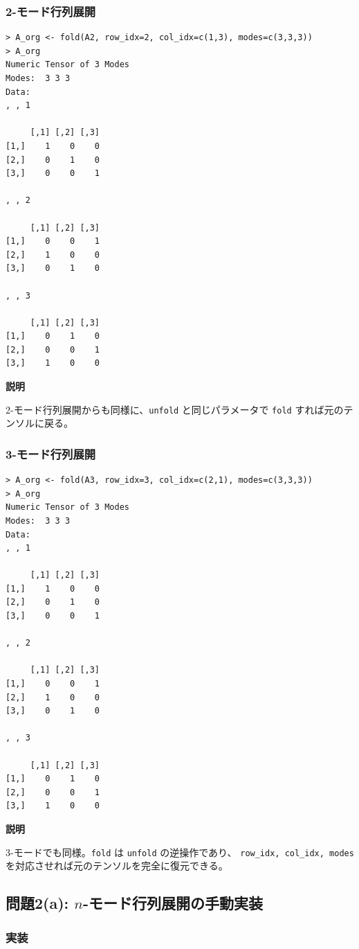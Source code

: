 \documentclass[12pt,a4paper]{ltjsarticle}
\begin{document}
\subsubsection{2-モード行列展開}
\begin{lstlisting}
> A_org <- fold(A2, row_idx=2, col_idx=c(1,3), modes=c(3,3,3))
> A_org
Numeric Tensor of 3 Modes
Modes:  3 3 3
Data:
, , 1

     [,1] [,2] [,3]
[1,]    1    0    0
[2,]    0    1    0
[3,]    0    0    1

, , 2

     [,1] [,2] [,3]
[1,]    0    0    1
[2,]    1    0    0
[3,]    0    1    0

, , 3

     [,1] [,2] [,3]
[1,]    0    1    0
[2,]    0    0    1
[3,]    1    0    0
\end{lstlisting}

\textbf{説明}

2-モード行列展開からも同様に、\texttt{unfold} と同じパラメータで
\texttt{fold} すれば元のテンソルに戻る。


\subsubsection{3-モード行列展開}
\begin{lstlisting}
> A_org <- fold(A3, row_idx=3, col_idx=c(2,1), modes=c(3,3,3))
> A_org
Numeric Tensor of 3 Modes
Modes:  3 3 3
Data:
, , 1

     [,1] [,2] [,3]
[1,]    1    0    0
[2,]    0    1    0
[3,]    0    0    1

, , 2

     [,1] [,2] [,3]
[1,]    0    0    1
[2,]    1    0    0
[3,]    0    1    0

, , 3

     [,1] [,2] [,3]
[1,]    0    1    0
[2,]    0    0    1
[3,]    1    0    0
\end{lstlisting}

\textbf{説明}

3-モードでも同様。\texttt{fold} は \texttt{unfold} の逆操作であり、
\texttt{row\_idx, col\_idx, modes} を対応させれば元のテンソルを完全に復元できる。

\newpage
\subsection{問題2(a): $n$-モード行列展開の手動実装}\label{subsec:2-a}

\subsubsection{実装}
\end{document}
